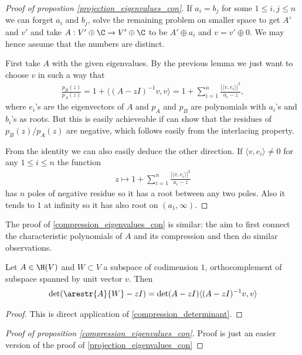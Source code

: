 \begin{proof}[Proof of propostion \ref{projection_eigenvalues_con}]
	If $a_{i} = b_{j}$ for some $1 \leq i, j \leq n$ we can forget $a_{i}$ and $b_{j}$, solve the remaining problem on smaller space to get $A'$ and $v'$ and take $A : V' \oplus \C \to V' \oplus \C$ to be $A' \oplus a_{i}$ and $v = v' \oplus 0$. We may hence assume that the numbers are distinct.

	First take $A$ with the given eigenvalues. By the previous lemma we just want to choose $v$ in such a way that
	\begin{align*}
		\frac{p_{B}(z)}{p_{A}(z)} = 1 + \langle (A - z I)^{-1}v, v\rangle= 1 + \sum_{i = 1}^{n} \frac{|\langle v, e_{i} \rangle|^2}{a_{i} - z},
	\end{align*}
	where $e_{i}$'s are the eigenvectors of $A$ and $p_{A}$ and $p_{B}$ are polynomials with $a_{i}$'s and $b_{i}$'s as roots. But this is easily achieveable if can show that the residues of $p_{B}(z)/p_{A}(z)$ are negative, which follows easily from the interlacing property.

	From the identity we can also easily deduce the other direction. If $\langle v, e_{i} \rangle \neq 0$ for any $1 \leq i \leq n$ the function
	\begin{align*}
		z \mapsto 1 + \sum_{i = 1}^{n} \frac{|\langle v, e_{i} \rangle|^2}{a_{i} - z}
	\end{align*}
	has $n$ poles of negative residue so it has a root between any two poles. Also it tends to $1$ at infinity so it has also root on $(a_{1}, \infty)$.
\end{proof}

The proof of \ref{compression_eigenvalues_con} is similar: the aim to first connect the characteristic polynomials of $A$ and its compression and then do similar observations.

\begin{lem}
	Let $A \in \H(V)$ and $W \subset V$ a subspace of codimension $1$, orthocomplement of subspace spanned by unit vector $v$. Then
	\begin{align*}
		\det(\arestr{A}{W} - z I) = \det(A - z I) \langle (A - z I)^{-1}v, v\rangle
	\end{align*}
\end{lem}
\begin{proof}
	This is direct application of \ref{compression_determinant}.
\end{proof}

\begin{proof}[Proof of proposition \ref{compression_eigenvalues_con}]
	Proof is just an easier version of the proof of \ref{projection_eigenvalues_con}
\end{proof}

